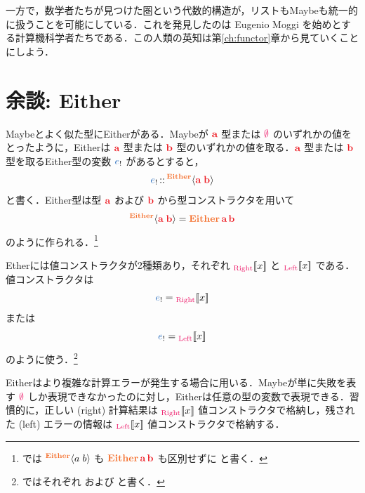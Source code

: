\documentclass[a5paper,twoside,fleqn,draft]{jsbook}
\begin{document}
一方で，数学者たちが見つけた圏という代数的構造が，リストもMaybeも統一的に扱うことを可能にしている．これを発見したのは Eugenio Moggi を始めとする計算機科学者たちである．この人類の英知は第\ref{ch:functor}章から見ていくことにしよう．

\separator



\section{余談: Either}

Maybeとよく似た型にEitherがある．Maybeが $\hTypeName{a}$ 型または $\hNothing$ のいずれかの値をとったように，Eitherは $\hTypeName{a}$ 型または $\hTypeName{b}$ 型のいずれかの値を取る．$\hTypeName{a}$ 型または $\hTypeName{b}$ 型を取るEither型の変数 $\hEitherVar{e}$ があるとすると，
\begin{equation}
  \hEitherVar{e}
  \hIsTypeOf{}\hEitherConstruct{\hTypeName{a}}{\hTypeName{b}}
\end{equation}
と書く．Either型は型 $\hTypeName{a}$ および $\hTypeName{b}$ から型コンストラクタを用いて
\begin{equation}
  \hEitherConstruct{\hTypeName{a}}{\hTypeName{b}}
  =\hEither\,\hTypeName{a} \,\hTypeName{b}
\end{equation}
のように作られる．\footnote{\haskell では $\hEitherConstruct{a}{b}$ も $\hEither\,\hTypeName{a}\,\hTypeName{b} $ も区別せずに と書く．}

Etherには値コンストラクタが2種類あり，それぞれ $\hRightWith{x}$ と $\hLeftWith{x}$ である．値コンストラクタは
\begin{equation}
  \hEitherVar{e}
  =\hRightWith{x}
\end{equation}
または
\begin{equation}
  \hEitherVar{e}
  =\hLeftWith{x}
\end{equation}
のように使う．\footnote{\haskell ではそれぞれ  および  と書く．}


Eitherはより複雑な計算エラーが発生する場合に用いる．Maybeが単に失敗を表す $\hNothing$ しか表現できなかったのに対し，Eitherは任意の型の変数で表現できる．習慣的に，正しい (right) 計算結果は $\hRightWith{x}$ 値コンストラクタで格納し，残された (left) エラーの情報は $\hLeftWith{x}$
値コンストラクタで格納する．
\end{document}

